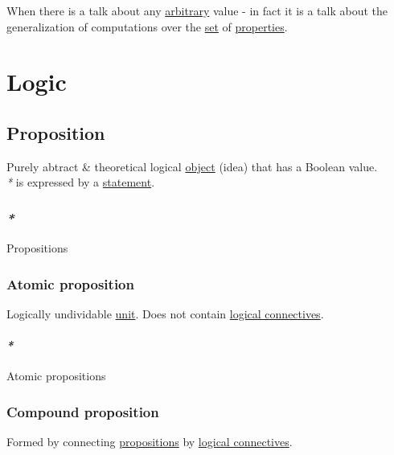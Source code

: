 \documentclass[a4paper,14pt,oneside]{book}
\begin{document}
When there is a talk about any \hyperref[orgec6a824]{arbitrary} value - in fact it is a talk about the generalization of computations over the \hyperref[orge119629]{set} of \hyperref[org1feb373]{properties}.\\

\chapter{Logic}
\label{sec:orgd257af3}
\section{\label{org19a0c89}Proposition}
\label{sec:orga6bd29c}
Purely abtract \& theoretical logical \hyperref[org5771609]{object} (idea) that has a Boolean value.\\

\emph{*} is expressed by a \hyperref[org722f075]{statement}.\\

\subsection{\emph{*}}
\label{sec:org76521d4}

\label{orgc79f0d2}Propositions\\

\subsection{\label{org61a55ca}Atomic proposition}
\label{sec:orge8798bd}
Logically undividable \hyperref[orgea7ee99]{unit}. Does not contain \hyperref[org91d10ef]{logical connectives}.\\

\subsubsection{\emph{*}}
\label{sec:orgdc68fc5}

\label{org2dff2d0}Atomic propositions\\

\subsection{\label{orgeb844ea}Compound proposition}
\label{sec:orgfa9f9dc}
Formed by connecting \hyperref[orgc79f0d2]{propositions} by \hyperref[org91d10ef]{logical connectives}.\\
\end{document}
